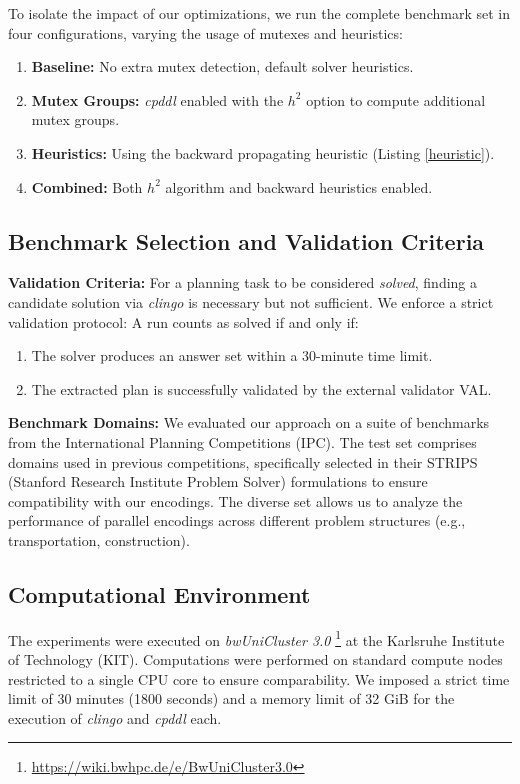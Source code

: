 \documentclass[
     11pt,                    %
     a4paper,             %
     BCOR=10mm,     %
     DIV=14,                 %
     listof=totoc,                    %
     bibliography=totoc,       %
     index=totoc,              %
     parskip            %
     twoside,
     headsepline
     ]{scrreprt}
\theoremstyle{definition}
\theoremstyle{definition}
\theoremstyle{remark}
\theoremstyle{bfnote}
\begin{document}
To isolate the impact of our optimizations, we run the complete benchmark set in four configurations, varying the usage of mutexes and heuristics:
\begin{enumerate}
    \item \textbf{Baseline:} No extra mutex detection, default solver heuristics.
    \item \textbf{Mutex Groups:} \textit{cpddl} enabled with the $h^2$ option to compute additional mutex groups.
    \item \textbf{Heuristics:} Using the backward propagating heuristic (Listing \ref{heuristic}).
    \item \textbf{Combined:} Both $h^2$ algorithm and backward heuristics enabled.
\end{enumerate}

\subsection{Benchmark Selection and Validation Criteria}
\textbf{Validation Criteria:}
For a planning task to be considered \textit{solved}, finding a candidate solution via \textit{clingo} is necessary but not sufficient. 
We enforce a strict validation protocol: A run counts as solved if and only if:
\begin{enumerate}
    \item The solver produces an answer set within a 30-minute time limit.
    \item The extracted plan is successfully validated by the external validator VAL.
\end{enumerate}

\textbf{Benchmark Domains:}
We evaluated our approach on a suite of benchmarks from the International Planning Competitions (IPC). 
The test set comprises domains used in previous competitions, specifically selected in their STRIPS (Stanford Research Institute Problem Solver) formulations to ensure compatibility with our encodings.
The diverse set allows us to analyze the performance of parallel encodings across different problem structures (e.g., transportation, construction).

\subsection{Computational Environment}
The experiments were executed on \textit{bwUniCluster 3.0} \footnote{\url{https://wiki.bwhpc.de/e/BwUniCluster3.0}} at the Karlsruhe Institute of Technology (KIT). 
Computations were performed on standard compute nodes restricted to a single CPU core to ensure comparability.
We imposed a strict time limit of 30 minutes (1800 seconds) and a memory limit of 32 GiB for the execution of \textit{clingo} and \textit{cpddl} each.
\end{document}
